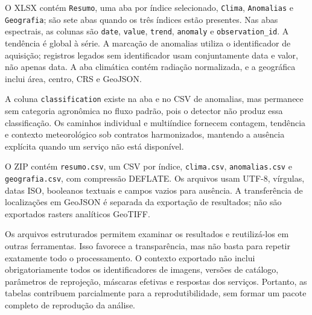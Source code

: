 O XLSX contém \texttt{Resumo}, uma aba por índice selecionado, \texttt{Clima}, \texttt{Anomalias} e \texttt{Geografia}; são sete abas quando os três índices estão presentes. Nas abas espectrais, as colunas são \texttt{date}, \texttt{value}, \texttt{trend}, \texttt{anomaly} e \texttt{observation\_id}. A tendência é global à série. A marcação de anomalias utiliza o identificador de aquisição; registros legados sem identificador usam conjuntamente data e valor, não apenas data. A aba climática contém radiação normalizada, e a geográfica inclui área, centro, CRS e GeoJSON.

A coluna \texttt{classification} existe na aba e no CSV de anomalias, mas permanece sem categoria agronômica no fluxo padrão, pois o detector não produz essa classificação. Os caminhos individual e multiíndice fornecem contagem, tendência e contexto meteorológico sob contratos harmonizados, mantendo a ausência explícita quando um serviço não está disponível.

O ZIP contém \texttt{resumo.csv}, um CSV por índice, \texttt{clima.csv}, \texttt{anomalias.csv} e \texttt{geografia.csv}, com compressão DEFLATE. Os arquivos usam UTF-8, vírgulas, datas ISO, booleanos textuais e campos vazios para ausência. A transferência de localizações em GeoJSON é separada da exportação de resultados; não são exportados rasters analíticos GeoTIFF.

Os arquivos estruturados permitem examinar os resultados e reutilizá-los em outras ferramentas. Isso favorece a transparência, mas não basta para repetir exatamente todo o processamento. O contexto exportado não inclui obrigatoriamente todos os identificadores de imagens, versões de catálogo, parâmetros de reprojeção, máscaras efetivas e respostas dos serviços. Portanto, as tabelas contribuem parcialmente para a reprodutibilidade, sem formar um pacote completo de reprodução da análise.
